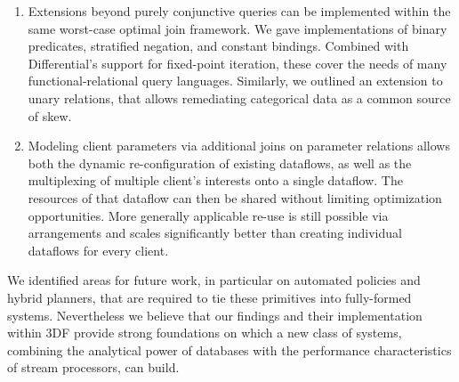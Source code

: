 \documentclass{article}
\begin{document}
\begin{enumerate}
\item
  Extensions beyond purely conjunctive queries can be implemented
  within the same worst-case optimal join framework. We gave
  implementations of binary predicates, stratified negation, and
  constant bindings. Combined with Differential's support for
  fixed-point iteration, these cover the needs of many
  functional-relational query languages. Similarly, we outlined an
  extension to unary relations, that allows remediating categorical
  data as a common source of skew.

\item
  Modeling client parameters via additional joins on parameter
  relations allows both the dynamic re-configuration of existing
  dataflows, as well as the multiplexing of multiple client's
  interests onto a single dataflow. The resources of that dataflow can
  then be shared without limiting optimization opportunities. More
  generally applicable re-use is still possible via arrangements and
  scales significantly better than creating individual dataflows for
  every client.

\end{enumerate}

We identified areas for future work, in particular on automated
policies and hybrid planners, that are required to tie these
primitives into fully-formed systems. Nevertheless we believe that our
findings and their implementation within 3DF provide strong
foundations on which a new class of systems, combining the analytical
power of databases with the performance characteristics of stream
processors, can build.

\newpage



\end{document}
